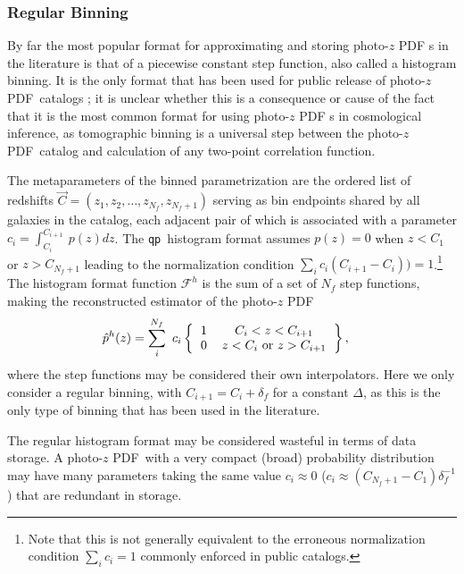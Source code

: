 \documentclass[\docopts]{\docclass}
\newcommand{\qp}{\texttt{qp}\xspace}
\newcommand{\pz}{photo-$z$ PDF\xspace}
\begin{document}
\subsubsection{Regular Binning}
\label{sec:bins}

By far the most popular format for approximating and storing \pz s in the literature is that of a piecewise constant step
function, also called a histogram binning.  It is the only format that has been
used for public release of \pz\ catalogs \citep{tanaka_photometric_2017,
sheldon_photometric_2012}; it is unclear whether this is a consequence or cause
of the fact that it is the most common format for using \pz s in cosmological
inference, as tomographic binning is a universal step between the \pz\ catalog
and calculation of any two-point correlation function.

The metaparameters of the binned parametrization are the ordered list of
redshifts $\vec{C} = (z_{1}, z_{2}, \dots, z_{N_{f}}, z_{N_{f}+1})$ serving as
bin endpoints shared by all galaxies in the catalog, each adjacent pair of
which is associated with a parameter $c_{i}=\int_{C_{i}}^{C_{i+1}}\ p(z)dz$.
The \qp\ histogram format assumes $p(z)=0$ when $z<C_{1}$ or $z>C_{N_{f}+1}$ leading
to the normalization condition $\sum_{i} c_{i}(C_{i+1}-C_{i})) = 1$.\footnote{Note that
this is not generally equivalent to the erroneous normalization condition
$\sum_{i} c_{i} = 1$ commonly enforced in public catalogs.}  The histogram
format function $\mathcal{F}^{h}$ is the sum of a set of $N_{f}$ step
functions, making the reconstructed estimator of the \pz
\begin{align}
  \label{eq:binned}
  \hat{p}^{h}(z) &= \sum_{i}^{N_{f}}\ c_{i}
\left\{\begin{tabular}{cc}$1$&$C_{i}<z<C_{i+1}$\\
0&$z < C_{i}$\ or\ $z > C_{i+1}$\end{tabular}\right\},
\end{align}
where the step functions may be considered their own interpolators.  Here we
only consider a regular binning, with $C_{i+1}=C_{i}+\delta_{f}$ for a constant
$\Delta$, as this is the only type of binning that has been used in the
literature.

The regular histogram format may be considered wasteful in terms of data storage. A \pz\ with a very compact (broad) probability distribution may have many
parameters taking the same value $c_{i}\approx0$
($c_{i}\approx(C_{N_{f}+1}-C_{1})\delta_{f}^{-1}$) that are redundant in
storage.
\end{document}
